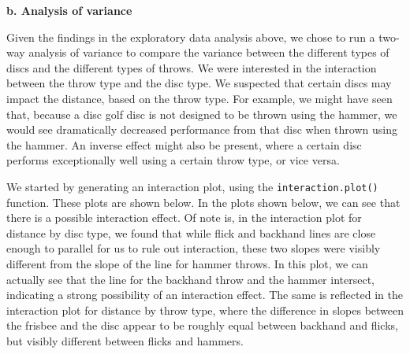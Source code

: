 \documentclass[letter,12pt]{article}
\begin{document}
	\begin{center}
		\textbf{b. Analysis of variance}\par
	\end{center}
	\justify
	Given the findings in the exploratory data analysis above, we chose to run a two-way analysis of variance to compare the variance between the different types of discs and the different types of throws. We were interested in the interaction between the throw type and the disc type. We suspected that certain discs may impact the distance, based on the throw type. For example, we might have seen that, because a disc golf disc is not designed to be thrown using the hammer, we would see dramatically decreased performance from that disc when thrown using the hammer. An inverse effect might also be present, where a certain disc performs exceptionally well using a certain throw type, or vice versa.\par
  We started by generating an interaction plot, using the \verb!interaction.plot()! function. These plots are shown below. In the plots shown below, we can see that there is a possible interaction effect. Of note is, in the interaction plot for distance by disc type, we found that while flick and backhand lines are close enough to parallel for us to rule out interaction, these two slopes were visibly different from the slope of the line for hammer throws. In this plot, we can actually see that the line for the backhand throw and the hammer intersect, indicating a strong possibility of an interaction effect. The same is reflected in the interaction plot for distance by throw type, where the difference in slopes between the frisbee and the disc appear to be roughly equal between backhand and flicks, but visibly different between flicks and hammers.\par
\end{document}
